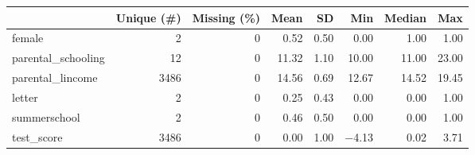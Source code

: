 \begin{table}
\centering
\begin{tabular}[t]{lrrrrrrr}
\toprule
  & Unique (\#) & Missing (\%) & Mean & SD & Min & Median & Max\\
\midrule
female & 2 & 0 & \num{0.52} & \num{0.50} & \num{0.00} & \num{1.00} & \num{1.00}\\
parental\_schooling & 12 & 0 & \num{11.32} & \num{1.10} & \num{10.00} & \num{11.00} & \num{23.00}\\
parental\_lincome & 3486 & 0 & \num{14.56} & \num{0.69} & \num{12.67} & \num{14.52} & \num{19.45}\\
letter & 2 & 0 & \num{0.25} & \num{0.43} & \num{0.00} & \num{0.00} & \num{1.00}\\
summerschool & 2 & 0 & \num{0.46} & \num{0.50} & \num{0.00} & \num{0.00} & \num{1.00}\\
test\_score & 3486 & 0 & \num{0.00} & \num{1.00} & \num{-4.13} & \num{0.02} & \num{3.71}\\
\bottomrule
\end{tabular}
\end{table}
